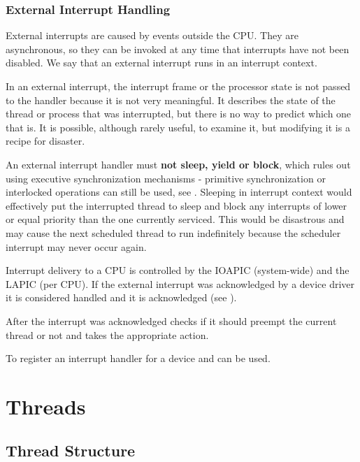 \begin{appendices}
\subsubsection{External Interrupt Handling}
\label{sect:ExtInterrupt}

External interrupts are caused by events outside the CPU. They are asynchronous, so they can be
invoked at any time that interrupts have not been disabled. We say that an external interrupt runs
in an interrupt context.

In an external interrupt, the interrupt frame or the processor state is not passed to the handler
because it is not very meaningful. It describes the state of the thread or process that was
interrupted, but there is no way to predict which one that is. It is possible, although rarely
useful, to examine it, but modifying it is a recipe for disaster.

An external interrupt handler must \textbf{not sleep, yield or block}, which rules out using executive
synchronization mechanisms - primitive synchronization or interlocked operations can still be used,
see .
Sleeping in interrupt context would effectively put the interrupted thread to sleep and block any
interrupts of lower or equal priority than the one currently serviced. This would be disastrous
and may cause the next scheduled thread to run indefinitely because the scheduler interrupt may
never occur again.

Interrupt delivery to a CPU is controlled by the IOAPIC (system-wide) and the LAPIC (per CPU). If
the external interrupt was acknowledged by a device driver it is considered handled and it is
acknowledged (see ).

After the interrupt was acknowledged  checks if it should preempt the
current thread or not and takes the appropriate action.

To register an interrupt handler for a device  and
 can be used.

\section{Threads}
\label{sect:Threads}

\subsection{Thread Structure}


\end{appendices}
